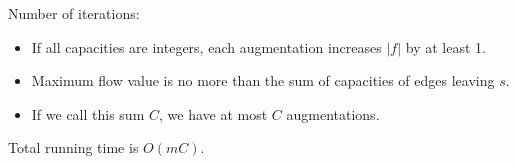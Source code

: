 Number of iterations:
\begin{itemize}
	\item If all capacities are integers, each augmentation increases $|f|$ by at least 1.
	\item Maximum flow value is no more than the sum of capacities of edges leaving $s$.
	\item If we call this sum $C$, we have at most $C$ augmentations.
\end{itemize}

Total running time is $O(mC)$.










